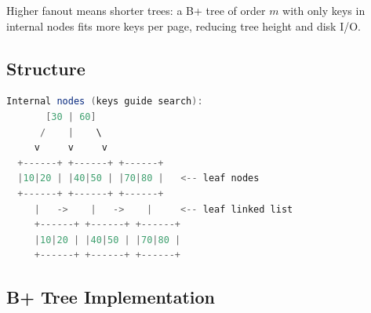 Higher fanout means shorter trees: a B+ tree of order $m$ with only keys in internal nodes fits more keys per page, reducing tree height and disk I/O.

\subsection{Structure}

\begin{lstlisting}[language=Java]
  Internal nodes (keys guide search):
       [30 | 60]
      /    |    \
     v     v     v
  +------+ +------+ +------+
  |10|20 | |40|50 | |70|80 |   <-- leaf nodes
  +------+ +------+ +------+
     |   ->    |   ->    |     <-- leaf linked list
     +------+ +------+ +------+
     |10|20 | |40|50 | |70|80 |
     +------+ +------+ +------+
\end{lstlisting}

\subsection{B+ Tree Implementation}

